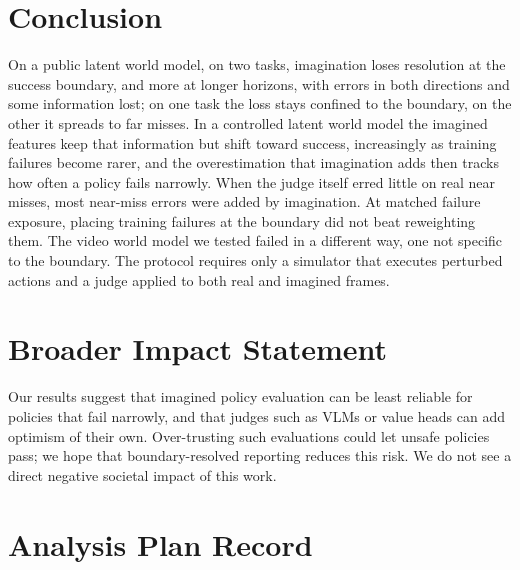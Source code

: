\documentclass[10pt]{article}
\begin{document}
\section{Conclusion}
\label{sec:conclusion}

On a public latent world model, on two tasks, imagination loses resolution at the success boundary, and more at longer horizons, with errors in both directions and some information lost; on one task the loss stays confined to the boundary, on the other it spreads to far misses. In a controlled latent world model the imagined features keep that information but shift toward success, increasingly as training failures become rarer, and the overestimation that imagination adds then tracks how often a policy fails narrowly. When the judge itself erred little on real near misses, most near-miss errors were added by imagination. At matched failure exposure, placing training failures at the boundary did not beat reweighting them. The video world model we tested failed in a different way, one not specific to the boundary. The protocol requires only a simulator that executes perturbed actions and a judge applied to both real and imagined frames.

\section*{Broader Impact Statement}
Our results suggest that imagined policy evaluation can be least reliable for policies that fail narrowly, and that judges such as VLMs or value heads can add optimism of their own. Over-trusting such evaluations could let unsafe policies pass; we hope that boundary-resolved reporting reduces this risk. We do not see a direct negative societal impact of this work.




\clearpage
\appendix

\section{Analysis Plan Record}
\label{app:prereg}
\end{document}
